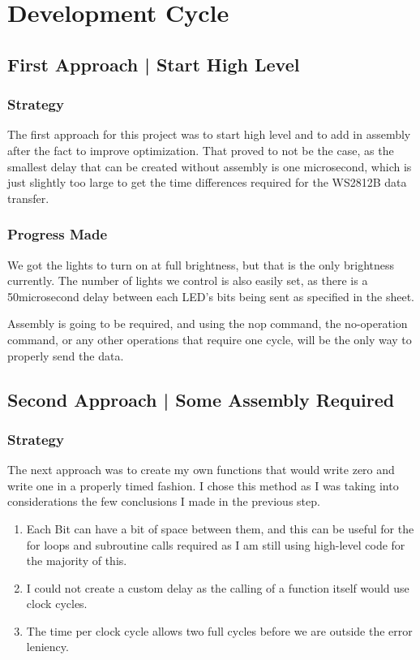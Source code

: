 \documentclass{scrartcl}
\begin{document}
\section{Development Cycle}

\subsection{First Approach | Start High Level}

\subsubsection{Strategy}
The first approach for this project was to start high level and to add in assembly after the fact to improve optimization. That proved to not be the case, as the smallest delay that can be created without assembly is one microsecond, which is just slightly too large to get the time differences required for the WS2812B data transfer.

\subsubsection{Progress Made}
We got the lights to turn on at full brightness, but that is the only brightness currently. The number of lights we control is also easily set, as there is a 50microsecond delay between each LED's bits being sent as specified in the sheet.

Assembly is going to be required, and using the nop command, the no-operation command, or any other operations that require one cycle, will be the only way to properly send the data.


\subsection{Second Approach | Some Assembly Required}

\subsubsection{Strategy}
The next approach was to create my own functions that would write zero and write one in a properly timed fashion. I chose this method as I was taking into considerations the few conclusions I made in the previous step.

\begin{enumerate}
    \item Each Bit can have a bit of space between them, and this can be useful for the for loops and subroutine calls required as I am still using high-level code for the majority of this.
    \item I could not create a custom delay as the calling of a function itself would use clock cycles.
    \item The time per clock cycle allows two full cycles before we are outside the error leniency.
\end{enumerate}
\end{document}
